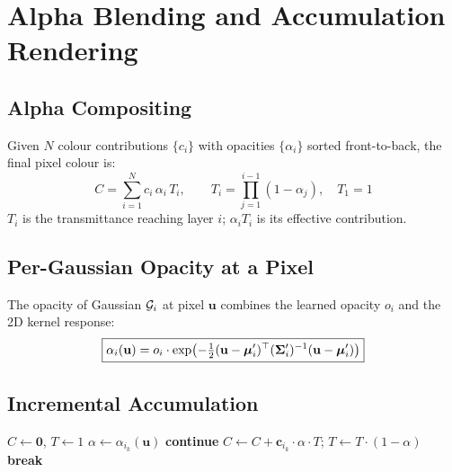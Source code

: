 \section{Alpha Blending and Accumulation Rendering}
\label{sec:alpha_blending}

\subsection{Alpha Compositing}

Given $N$ colour contributions $\{c_i\}$ with opacities $\{\alpha_i\}$ sorted
front-to-back, the final pixel colour is:
\begin{equation}
  \boxed{
    C = \sum_{i=1}^{N} c_i\,\alpha_i\,T_i
  }, \qquad
  T_i = \prod_{j=1}^{i-1}(1 - \alpha_j), \quad T_1 = 1
  \label{eq:alpha_blend}
\end{equation}
$T_i$ is the transmittance reaching layer $i$; $\alpha_i T_i$ is its effective
contribution.

\subsection{Per-Gaussian Opacity at a Pixel}

The opacity of Gaussian $\mathcal{G}_i$ at pixel $\mathbf{u}$ combines the learned
opacity $o_i$ and the 2D kernel response:
\begin{equation}
  \boxed{
    \alpha_i(\mathbf{u}) = o_i \cdot
      \exp\!\left(
        -\tfrac{1}{2}(\mathbf{u} - \boldsymbol{\mu}'_i)^\top(\boldsymbol{\Sigma}'_i)^{-1}(\mathbf{u} - \boldsymbol{\mu}'_i)
      \right)
  }
  \label{eq:per_gaussian_alpha}
\end{equation}

\subsection{Incremental Accumulation}

\begin{algorithm}[H]
  \caption{Alpha Blending per Pixel (front-to-back)}
  \label{alg:alpha_blend}
  \begin{algorithmic}[1]
    \State $C \leftarrow \mathbf{0}$, \quad $T \leftarrow 1$
      \State $\alpha \leftarrow \alpha_{i_k}(\mathbf{u})$
      \If{$\alpha < \epsilon_{\min}$} \textbf{continue} \EndIf
      \State $C \leftarrow C + \mathbf{c}_{i_k} \cdot \alpha \cdot T$; \quad
             $T \leftarrow T \cdot (1 - \alpha)$
       \textbf{break} \EndIf
    \EndFor
    \State {}
  \end{algorithmic}
\end{algorithm}

